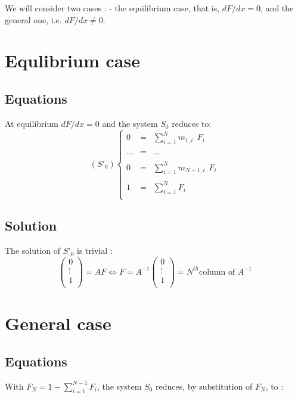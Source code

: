 \documentclass[a4paper,12pt]{article}
\begin{document}
We will consider two cases : - the equilibrium case, that is, $dF/dx=0$, and the general one, i.e. $dF/dx \neq 0$.
\section{Equlibrium case} 
\subsection{Equations}
At equilibrium  $dF/dx=0$ and the system $S_0$ reduces to:
$$(S'_0)\left\lbrace
\begin{array}{lcl}
0 &=& \sum_{i=1}^N m_{1,i} \ \ F_i  \\
 & & \\
... &=& ...\\
 & & \\
0 &=& \sum_{i=1}^N m_{N-1,i} \ \ F_i \\
 & & \\
1 &=&\sum_{i=1}^N F_i\\
\end{array}\right.$$

\subsection{Solution}
The solution of $S'_0$ is trivial :
\begin{equation}
\begin{pmatrix}
0 \\ 
 \vdots\\
1\\ \end{pmatrix} = A F \Leftrightarrow F=A^{-1} \begin{pmatrix}
0 \\ 
 \vdots\\
1\\ \end{pmatrix} = N^{th} \text{column of } A^{-1}
\end{equation}

\section{ General case} 
 \subsection{Equations}
 With $F_N=1-\sum_{i=1}^{N-1} F_i$, the system $S_0$ reduces, by substitution of $F_N$, to :
\end{document}
